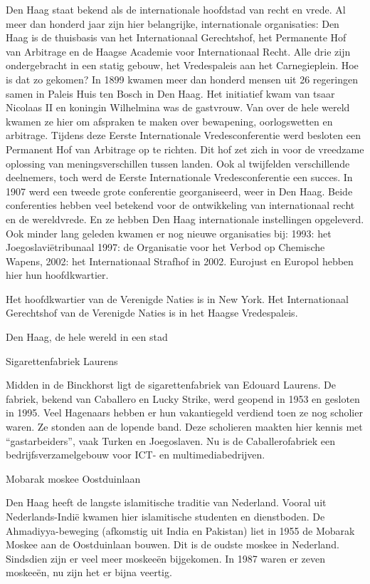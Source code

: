 \documentclass[
  a4paper,
]{book}
\theoremstyle{definition}
\theoremstyle{definition}
\theoremstyle{definition}
\theoremstyle{definition}
\theoremstyle{remark}
\begin{document}
Den Haag staat bekend als de internationale hoofdstad van recht en vrede.
Al meer dan honderd jaar zijn hier belangrijke, internationale organisaties:
Den Haag is de thuisbasis van het Internationaal Gerechtshof, het Permanente Hof van Arbitrage en de Haagse Academie voor Internationaal Recht.
Alle drie zijn ondergebracht in een statig gebouw, het Vredespaleis aan het Carnegieplein.
Hoe is dat zo gekomen?
In 1899 kwamen meer dan honderd mensen uit 26 regeringen samen in Paleis Huis ten Bosch in Den Haag.
Het initiatief kwam van tsaar Nicolaas II en koningin Wilhelmina was de gastvrouw.
Van over de hele wereld kwamen ze hier om afspraken te maken over bewapening, oorlogswetten en arbitrage.
Tijdens deze Eerste Internationale Vredesconferentie werd besloten een Permanent Hof van Arbitrage op te richten.
Dit hof zet zich in voor de vreedzame oplossing van meningsverschillen tussen landen.
Ook al twijfelden verschillende deelnemers, toch werd de Eerste Internationale Vredesconferentie een succes.
In 1907 werd een tweede grote conferentie georganiseerd, weer in Den Haag.
Beide conferenties hebben veel betekend voor de ontwikkeling van internationaal recht en de wereldvrede. En ze hebben Den Haag internationale instellingen opgeleverd.
Ook minder lang geleden kwamen er nog nieuwe organisaties bij:
1993: het Joegoslaviëtribunaal
1997: de Organisatie voor het Verbod op Chemische Wapens,
2002: het Internationaal Strafhof in 2002.
Eurojust en Europol hebben hier hun hoofdkwartier.

Het hoofdkwartier van de Verenigde Naties is in New York.
Het Internationaal Gerechtshof van de Verenigde Naties is in het Haagse Vredespaleis.

Den Haag, de hele wereld in een stad

Sigarettenfabriek Laurens

Midden in de Binckhorst ligt de sigarettenfabriek van Edouard Laurens. De fabriek, bekend van Caballero en Lucky Strike, werd geopend in 1953 en gesloten in 1995. Veel Hagenaars hebben er hun vakantiegeld verdiend toen ze nog scholier waren. Ze stonden aan de lopende band. Deze scholieren maakten hier kennis met ``gastarbeiders'', vaak Turken en Joegoslaven. Nu is de Caballerofabriek een bedrijfsverzamelgebouw voor ICT- en multimediabedrijven.

Mobarak moskee Oostduinlaan

Den Haag heeft de langste islamitische traditie van Nederland. Vooral uit Nederlands-Indië kwamen hier islamitische studenten en dienstboden. De Ahmadiyya-beweging (afkomstig uit India en Pakistan) liet in 1955 de Mobarak Moskee aan de Oostduinlaan bouwen. Dit is de oudste moskee in Nederland. Sindsdien zijn er veel meer moskeeën bijgekomen. In 1987 waren er zeven moskeeën, nu zijn het er bijna veertig.
\end{document}

